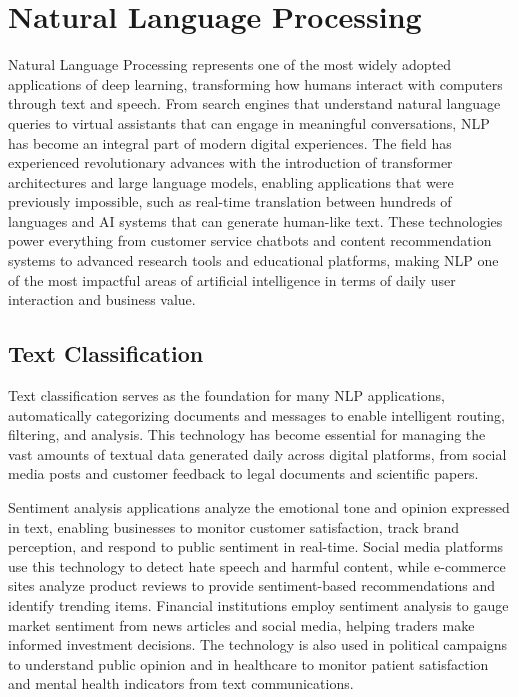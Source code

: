 
\section{Natural Language Processing }
\label{sec:nlp-applications}

Natural Language Processing represents one of the most widely adopted applications of deep learning, transforming how humans interact with computers through text and speech. From search engines that understand natural language queries to virtual assistants that can engage in meaningful conversations, NLP has become an integral part of modern digital experiences. The field has experienced revolutionary advances with the introduction of transformer architectures and large language models, enabling applications that were previously impossible, such as real-time translation between hundreds of languages and AI systems that can generate human-like text. These technologies power everything from customer service chatbots and content recommendation systems to advanced research tools and educational platforms, making NLP one of the most impactful areas of artificial intelligence in terms of daily user interaction and business value.

\subsection{Text Classification}

Text classification serves as the foundation for many NLP applications, automatically categorizing documents and messages to enable intelligent routing, filtering, and analysis. This technology has become essential for managing the vast amounts of textual data generated daily across digital platforms, from social media posts and customer feedback to legal documents and scientific papers.

Sentiment analysis applications analyze the emotional tone and opinion expressed in text, enabling businesses to monitor customer satisfaction, track brand perception, and respond to public sentiment in real-time. Social media platforms use this technology to detect hate speech and harmful content, while e-commerce sites analyze product reviews to provide sentiment-based recommendations and identify trending items. Financial institutions employ sentiment analysis to gauge market sentiment from news articles and social media, helping traders make informed investment decisions. The technology is also used in political campaigns to understand public opinion and in healthcare to monitor patient satisfaction and mental health indicators from text communications.

